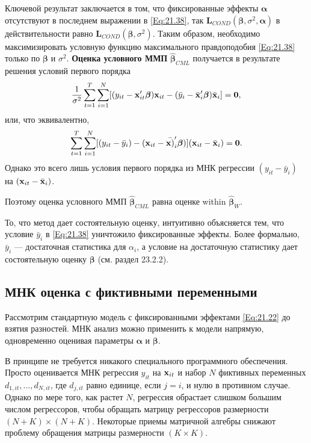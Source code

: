 Ключевой результат заключается в том, что фиксированные эффекты $\bm\alpha$ отсутствуют в последнем выражении в \ref{Eq:21.38}, так $\mathbf L_{COND}(\bm\beta, \sigma^2, \bm\alpha)$ в действительности равно $\mathbf L_{COND}(\bm\beta, \sigma^2)$. Таким образом, необходимо максимизировать условную функцию максимального правдоподобия \ref{Eq:21.38} только по $\bm\beta$ и $\sigma^2$. \textbf{Оценка условного ММП} $\hat{\bm\beta}_{CML}$ получается в результате решения условий первого порядка
\begin{align}
\frac{1}{\sigma^2} \sum^T_{t=1} \sum^N_{i=1} [(y_{it}-\mathbf{x}'_{it}\bm\beta)\mathbf{x}_{it}-(\bar{y}_i-\bar{\mathbf{x}}'_i\bm\beta)\bar{\mathbf{x}}_i]=\mathbf 0,
\nonumber
\end{align}
или, что эквивалентно,
 \begin{align}
 \sum^T_{t=1} \sum^N_{i=1} [(y_{it}-\bar{y}_i)-(\mathbf{x}_{it}-\bar{\mathbf{x})}'_i\bm\beta)]
(\mathbf{x}_{it}-\bar{\mathbf{x}}_i)=\mathbf 0.
\nonumber
\end{align}
Однако это всего лишь условия первого порядка из МНК регрессии $(y_{it}-\bar{y}_i)$ на $(\mathbf{x}_{it}-\bar{\mathbf{x}}_i)$.

Поэтому оценка условного ММП $\hat{\bm\beta}_{CML}$ равна оценке within $\hat{\bm\beta}_W$.

То, что метод дает состоятельную оценку, интуитивно объясняется тем, что условие $\bar{y}_i$ в \ref{Eq:21.38} уничтожило фиксированные эффекты. Более формально, $\bar{y}_i$ --- достаточная статистика для $\alpha_i$, а условие на достаточную статистику дает состоятельную оценку $\bm\beta$ (см. раздел 23.2.2).


\subsection{МНК оценка с фиктивными переменными}

Рассмотрим стандартную модель с фиксированными эффектами \ref{Eq:21.22} до взятия разностей. МНК анализ можно применить к модели напрямую, одновременно оценивая параметры $\bm\alpha$ и $\bm\beta$.

В принципе не требуется никакого специального программного обеспечения. Просто оценивается МНК регрессия $y_{it}$ на $\mathbf{x}_{it}$ и набор $N$ фиктивных переменных $d_{1,it}, \dots, d_{N,it}$, где $d_{j,it}$ равно единице, если $j=i$, и нулю в противном случае. Однако по мере того, как растет $N$, регрессия обрастает слишком большим числом регрессоров, чтобы обращать матрицу регрессоров размерности $(N+K) \times (N + K)$. Некоторые приемы матричной алгебры снижают проблему обращения матрицы размерности $(K \times K)$.

